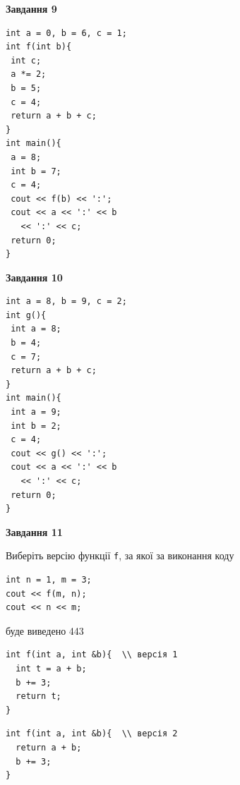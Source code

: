 \documentclass[12pt, ukrainian]{article}
\def\code#1{\Verb!#1!}
\begin{document}
{\begin {large}
\begin{minipage}[t]{11.0cm}
\end{minipage}


\begin{minipage}[t]{7.0cm}

\begin{center}
\textbf{Завдання 9}
\end{center}
\vspace{-8mm}

\begin{verbatim}
int a = 0, b = 6, c = 1;
int f(int b){
 int c;
 a *= 2;
 b = 5;
 c = 4;
 return a + b + c;
}
int main(){
 a = 8;
 int b = 7;
 c = 4;
 cout << f(b) << ':';
 cout << a << ':' << b 
   << ':' << c;
 return 0;
}
\end{verbatim}



\begin{center}
\textbf{Завдання 10}
\end{center}
\vspace{-8mm}

\begin{verbatim}
int a = 8, b = 9, c = 2;
int g(){
 int a = 8;
 b = 4;
 c = 7;
 return a + b + c;
}
int main(){
 int a = 9;
 int b = 2;
 c = 4;
 cout << g() << ':';
 cout << a << ':' << b 
   << ':' << c;
 return 0;
}
\end{verbatim}

\end{minipage}
\vline \hspace{1mm}
\begin{minipage}[t]{11.0cm}

\begin{center}
\textbf{Завдання 11}
\end{center}
Виберіть версію функції \code{f}, за якої за виконання коду
\begin{verbatim}
int n = 1, m = 3;
cout << f(m, n);
cout << n << m;
\end{verbatim}

буде виведено 443

\begin{verbatim}
int f(int a, int &b){  \\ версія 1
  int t = a + b;
  b += 3;
  return t;
}
\end{verbatim}

\vspace{-8mm}\begin{verbatim}
int f(int a, int &b){  \\ версія 2
  return a + b;
  b += 3;
}
\end{verbatim}


\end{minipage}
\end{large}}
\end{document}
